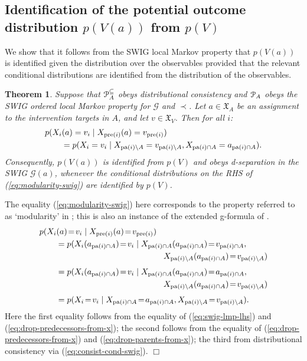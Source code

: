 \documentclass[11pt]{article}
\DeclareMathOperator{\pa}{pa}
\DeclareMathOperator{\pre}{pre}
\newtheorem{theorem}{Theorem}
\newcommand{\G}{{\mathscr G}}
\begin{document}
{\subsection{Identification of the potential outcome distribution $p(V(a))$ from $p(V)$}

We show that it follows from the SWIG local Markov property that $p(V(a))$ is identified given the distribution over the observables provided that the relevant conditional distributions are identified from the distribution of the observables.

\begin{theorem}\label{thm:swig-identify}
Suppose that ${\cal P}^{\subseteq}_A$ obeys distributional consistency and ${\cal P}_A$  obeys the 
SWIG ordered local Markov property for $\G$  and $\prec$.
Let $a\in  \mathfrak{X}_{A}$ be an assignment to the intervention targets in $A$, and let $v \in \mathfrak{X}_{V}$. Then for all $i$:
\begin{align}
\MoveEqLeft{p(X_i({ a})=v_i \mid X_{\pre(i)}({ a})= v_{\pre(i)})}\nonumber\\
&= p(X_i=v_i \mid  X_{\pa(i) \setminus A} = v_{\pa(i) \setminus A}, X_{\pa(i)\cap A}=a_{\pa(i)\cap A}).\label{eq:modularity-swig}
\end{align}
Consequently, $p(V({a}))$ is identified from $p(V)$ and obeys d-separation in the SWIG $\G({a})$,
whenever the conditional distributions on the RHS of {\rm (\ref{eq:modularity-swig})} are
identified by $p(V)$.
\end{theorem}

\noindent The equality (\ref{eq:modularity-swig}) here corresponds to the property referred to as `modularity' in \citep{thomas13swig}; this is also an instance
of the extended g-formula of \citet{robins86new,robins:effects:2004}.\\

\begin{align}
\MoveEqLeft{p(X_i(a)\!=\! v_i \mid X_{\pre(i)}(a)\!=\! v_{\pre(i)})
}\nonumber\\
&=  p(X_i({ a}_{\pa(i)\cap A})\!=\! v_i \mid X_{\pa(i)\cap A}({ a}_{\pa(i)\cap A})\!=\! v_{\pa(i)\cap A},\nonumber\\
&\kern130pt X_{\pa(i)\setminus A}({ a}_{\pa(i)\cap A})\!=\! v_{\pa(i)\setminus A} ) \nonumber\\[4pt]
&=  p(X_i({ a}_{\pa(i)\cap A})\!=\! v_i \mid X_{\pa(i)\cap A}({ a}_{\pa(i)\cap A})\!=\! a_{\pa(i)\cap A},\nonumber\\
&\kern130pt X_{\pa(i)\setminus A}({ a}_{\pa(i)\cap A})\!=\! v_{\pa(i)\setminus A} ) \nonumber\\[4pt]
&=  p(X_i\!=\! v_i \mid X_{\pa(i)\cap A}\!=\! a_{\pa(i)\cap A}, X_{\pa(i)\setminus A}\!=\! v_{\pa(i)\setminus A} ).
\end{align}
Here the first equality follows from the equality of (\ref{eq:swig-lmp-lhs}) and (\ref{eq:drop-predecessors-from-x});  the second follows from
the equality of (\ref{eq:drop-predecessors-from-x}) and (\ref{eq:drop-parents-from-x}); the third from distributional consistency via (\ref{eq:consist-cond-swig}).
\hfill$\Box$

}
\end{document}
